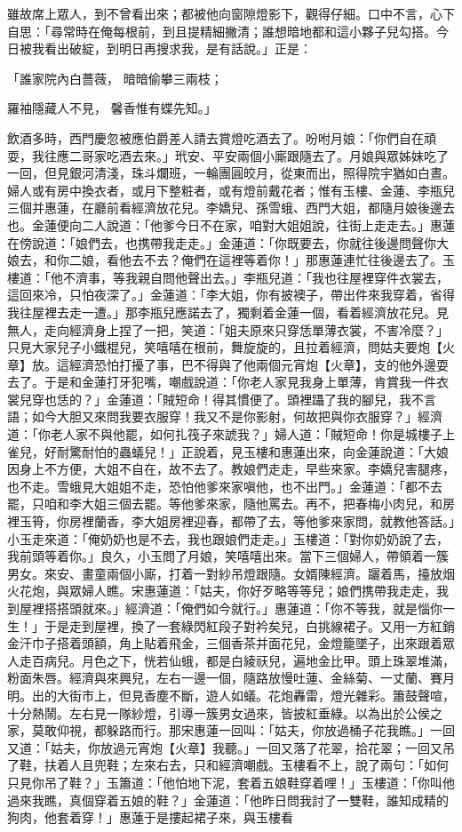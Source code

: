 雖故席上眾人，到不曾看出來；都被他向窗隙燈影下，觀得仔細。口中不言，心下自思：「尋常時在俺每根前，到且提精細撇清；誰想暗地都和這小夥子兒勾搭。今日被我看出破綻，到明日再搜求我，是有話說。」正是：

「誰家院內白薔薇，  暗暗偷攀三兩枝；

羅袖隱藏人不見，  馨香惟有蝶先知。」

飲酒多時，西門慶忽被應伯爵差人請去賞燈吃酒去了。吩咐月娘：「你們自在頑耍，我往應二哥家吃酒去來。」玳安、平安兩個小廝跟隨去了。月娘與眾姊妹吃了一回，但見銀河清淺，珠斗爛班，一輪團圓皎月，從東而出，照得院宇猶如白晝。婦人或有房中換衣者，或月下整粧者，或有燈前戴花者；惟有玉樓、金蓮、李瓶兒三個并惠蓮，在廳前看經濟放花兒。李嬌兒、孫雪蛾、西門大姐，都隨月娘後邊去也。金蓮便向二人說道：「他爹今日不在家，咱對大姐姐說，往街上走走去。」惠蓮在傍說道：「娘們去，也携帶我走走。」金蓮道：「你既要去，你就往後邊問聲你大娘去，和你二娘，看他去不去？俺們在這裡等着你！」那惠蓮連忙往後邊去了。玉樓道：「他不濟事，等我親自問他聲出去。」李瓶兒道：「我也往屋裡穿件衣裳去，這回來冷，只怕夜深了。」金蓮道：「李大姐，你有披襖子，帶出件來我穿着，省得我往屋裡去走一遭。」那李瓶兒應諾去了，獨剩着金蓮一個，看着經濟放花兒。見無人，走向經濟身上捏了一把，笑道：「姐夫原來只穿恁單薄衣裳，不害冷麼？」只見大家兒子小鐵棍兒，笑嘻嘻在根前，舞旋旋的，且拉着經濟，問姑夫要炮【火章】放。這經濟恐怕打擾了事，巴不得與了他兩個元宵炮【火章】，支的他外邊耍去了。于是和金蓮打牙犯嘴，嘲戲說道：「你老人家見我身上單薄，肯賞我一件衣裳兒穿也恁的？」金蓮道：「賊短命！得其慣便了。頭裡躡了我的腳兒，我不言語；如今大胆又來問我要衣服穿！我又不是你影射，何故把與你衣服穿？」經濟道：「你老人家不與他罷，如何扎筏子來諕我？」婦人道：「賊短命！你是城樓子上雀兒，好耐驚耐怕的蟲蟻兒！」正說着，見玉樓和惠蓮出來，向金蓮說道：「大娘因身上不方便，大姐不自在，故不去了。教娘們走走，早些來家。李嬌兒害腿疼，也不走。雪蛾見大姐姐不走，恐怕他爹來家嗔他，也不出門。」金蓮道：「都不去罷，只咱和李大姐三個去罷。等他爹來家，隨他罵去。再不，把春梅小肉兒，和房裡玉筲，你房裡蘭香，李大姐房裡迎春，都帶了去，等他爹來家問，就教他答話。」小玉走來道：「俺奶奶也是不去，我也跟娘們走走。」玉樓道：「對你奶奶說了去，我前頭等着你。」良久，小玉問了月娘，笑嘻嘻出來。當下三個婦人，帶領着一簇男女。來安、畫童兩個小廝，打着一對紗吊燈跟隨。女婿陳經濟。躧着馬，擡放烟火花炮，與眾婦人瞧。宋惠蓮道：「姑夫，你好歹略等等兒；娘們携帶我走走，我到屋裡搭搭頭就來。」經濟道：「俺們如今就行。」惠蓮道：「你不等我，就是惱你一生！」于是走到屋裡，換了一套綠閃紅段子對衿矣兒，白挑線裙子。又用一方紅銷金汗巾子搭着頭額，角上貼着飛金，三個香茶并面花兒，金燈籠墜子，出來跟着眾人走百病兒。月色之下，恍若仙蛾，都是白綾祆兒，遍地金比甲。頭上珠翠堆滿，粉面朱唇。經濟與來興兒，左右一邊一個，隨路放慢吐蓮、金絲菊、一丈蘭、賽月明。出的大街市上，但見香塵不斷，遊人如蟻。花炮轟雷，燈光雜彩。簫鼓聲喧，十分熱鬧。左右見一隊紗燈，引導一簇男女過來，皆披紅垂綠。以為出於公侯之家，莫敢仰視，都躲路而行。那宋惠蓮一回叫：「姑夫，你放過桶子花我瞧。」一回又道：「姑夫，你放過元宵炮【火章】我聽。」一回又落了花翠，拾花翠；一回又吊了鞋，扶着人且兜鞋；左來右去，只和經濟嘲戲。玉樓看不上，說了兩句：「如何只見你吊了鞋？」玉簫道：「他怕地下泥，套着五娘鞋穿着哩！」玉樓道：「你叫他過來我瞧，真個穿着五娘的鞋？」金蓮道：「他昨日問我討了一雙鞋，誰知成精的狗肉，他套着穿！」惠蓮于是摟起裙子來，與玉樓看